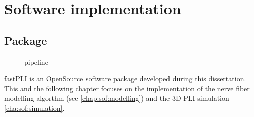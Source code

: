 \setcounter{chapter}{3}
\chapter{Software implementation}
\label{chap:Software}
% 
% 
\section{Package}
% 
\begin{figure}[!t]
\centering
{}
\caption{pipeline}
\label{fig:fastpli_pipeline}
\end{figure}
% 
\ac{fastPLI} is an OpenSource software package developed during this dissertation.
% 
This and the following chapter focuses on the implementation of the nerve fiber modelling algorthm (see \cref{chap:sof:modelling}) and the \ac{3D-PLI} simulation \cref{cha:sof:simulation}.
% 
